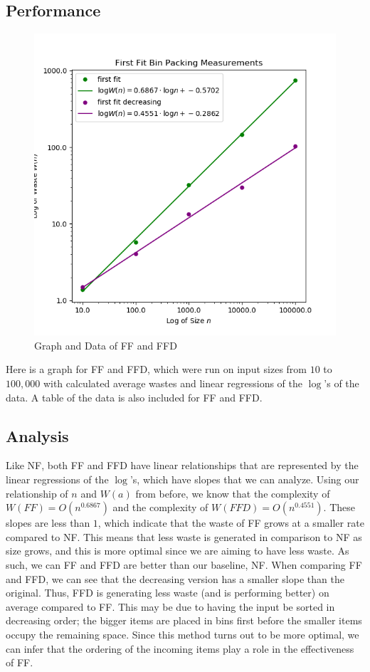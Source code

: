 \documentclass{article}
\begin{document}
\subsection{Performance}
    \begin{figure}[H]
        \centering
        \includegraphics[scale=0.60]{"../images/first-fit"}
        \caption{Graph and Data of FF and FFD}
    \end{figure}
    Here is a graph for FF and FFD, which were run on input sizes from $10$ to 
    $100,000$ with calculated average wastes and linear regressions of the 
    $\log$'s of the data. A table of the data is also included for FF and FFD.
\subsection{Analysis}
    Like NF, both FF and FFD have linear relationships that are represented by 
    the linear regressions of the $\log$'s, which have slopes that we can 
    analyze. Using our relationship of $n$ and $W(a)$ from before, we know that
    the complexity of $W(FF) = O\left( n^{0.6867} \right)$ and the complexity of 
    $W(FFD) = O\left( n^{0.4551} \right)$. These slopes are less than $1$, which
    indicate that the waste of FF grows at a smaller rate compared to NF. This 
    means that less waste is generated in comparison to NF as size grows, and 
    this is more optimal since we are aiming to have less waste. As such, we can
    FF and FFD are better than our baseline, NF.
    \nextblurb
    When comparing FF and FFD, we can see that the decreasing version has a
    smaller slope than the original. Thus, FFD is generating less waste (and is
    performing better) on average compared to FF. This may be due to having the
    input be sorted in decreasing order; the bigger items are placed in bins 
    first before the smaller items occupy the remaining space. Since this method
    turns out to be more optimal, we can infer that the ordering of the incoming
    items play a role in the effectiveness of FF.
\end{document}
